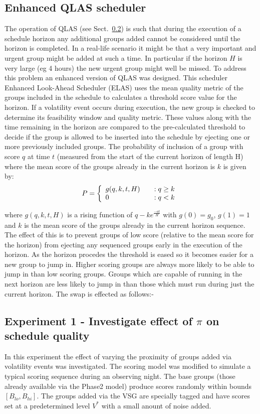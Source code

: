 \subsection{Enhanced QLAS scheduler}
The operation of QLAS (see Sect.~\ref{}) is such that during the execution of a schedule horizon any additional groups added cannot be considered until the horizon is completed. In a real-life scenario it might be that a very important and urgent group might be added at such a time. In particular if the horizon $H$ is very large (eg 4 hours) the new urgent group might well be missed. To address this problem an enhanced version of QLAS was designed. This scheduler Enhanced Look-Ahead Scheduler (ELAS) uses the mean quality metric of the groups included in the schedule to calculates a threshold score value for the horizon. If a volatility event occurs during execution, the new group is checked to determine its feasibility window and quality metric. These values along with the time remaining in the horizon are compared to the pre-calculated threshold to decide if the group is allowed to be inserted into the schedule by ejecting one or more previously included groups. The probability of inclusion of a group with score $q$ at time $t$ (measured from the start of the current horizon of length H) where the mean score of the groups already in the current horizon is $k$ is given by:
 \[
  P = \left\{
  \begin{array}{l l}
    g(q,k,t,H) & \quad : q \geq k\\
    0          & \quad : q < k\\
  \end{array} \right.
\]

where $g(q,k,t,H)$ is a rising function of $q-ke^{\frac{-at}{H}}$ with $g(0) = g_0$, $g(1) = 1$ and $k$ is the mean score of the groups already in the current horizon sequence. The effect of this is to prevent groups of low score (relative to the mean score for the horizon) from ejecting any sequenced groups early in the execution of the horizon. As the horizon procedes the threshold is eased so it becomes easier for a new group to jump in. Higher scoring groups are always more likely to be able to jump in than low scoring groups. Groups which are capable of running in the next horizon are less likely to jump in than those which must run during just the current horizon. The swap is effected as follows:-


\subsection{Experiment 1 - Investigate effect of $\pi$ on schedule quality}
In this experiment the effect of varying the proximity of groups added via volatility events was investigated. The scoring model was modified to simulate a typical scoring sequence during an observing night. The base groups (those already available via the Phase2 model) produce scores randomly within bounds $[B_{lo}, B_{hi}]$. The groups added via the VSG are specially tagged and have scores set at a predetermined level $V^*$ with a small anount of noise added. 

